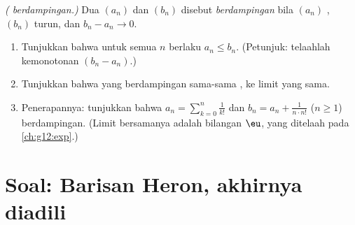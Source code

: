 \begin{exercise}[$\star\star\star$]\label{exo:g12:seq:10}
\emph{( berdampingan.)} Dua  $(a_n)$ dan $(b_n)$ disebut
\emph{berdampingan} bila $(a_n)$ , $(b_n)$ turun, dan
$b_n - a_n \to 0$.
\begin{enumerate}
  \item Tunjukkan bahwa untuk semua $n$ berlaku $a_n \leq b_n$. (Petunjuk:
        telaahlah kemonotonan $(b_n - a_n)$.)
  \item Tunjukkan bahwa  yang berdampingan sama-sama , ke limit
        yang sama.
  \item Penerapannya: tunjukkan bahwa 
        $a_n = \sum_{k=0}^{n} \frac{1}{k!}$ dan
        $b_n = a_n + \frac{1}{n \cdot n!}$ ($n \geq 1$) berdampingan. (Limit
        bersamanya adalah bilangan $\eu$, yang ditelaah pada \cref{ch:g12:exp}.)
\end{enumerate}
\end{exercise}

\section{Soal: Barisan Heron, akhirnya diadili}

